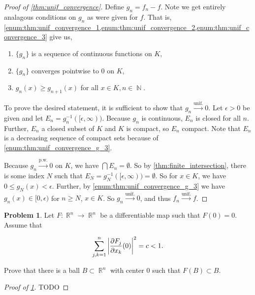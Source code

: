 \documentclass[english]{article}
\DeclareMathOperator{\R}{\mathbb{R}}
\DeclareMathOperator{\N}{\mathbb{N}}
\newcommand{\inv}[1]{#1^{-1}}
\theoremstyle{definition}
\newtheorem{problem}[theorem]{Problem}
\begin{document}
\begin{proof}[Proof of \cref{thm:unif_convergence}]
    Define $g_n = f_n - f$. Note we get entirely analagous conditions on $g_n$ as were given for $f$. That is, \cref{enum:thm:unif_convergence_1,enum:thm:unif_convergence_2,enum:thm:unif_convergence_3} give us,

    \begin{enumerate}
        \item \label{enum:thm:unif_convergence_g_1} $\{g_n\}$ is a sequence of continuous functions on $K$,
        \item \label{enum:thm:unif_convergence_g_2} $\{g_n\}$ converges pointwise to 0 on $K$,
        \item \label{enum:thm:unif_convergence_g_3} $g_n(x) \geq g_{n + 1}(x)$ for all $x \in K, n \in \N$.
    \end{enumerate}
    
    To prove the desired statement, it is sufficient to show that $g_n \overset{\text{unif.}}{\to} 0$. Let $\epsilon > 0$ be given and let $E_n = \inv{g_n}([\epsilon, \infty))$. Because $g_n$ is continuous, $E_n$ is closed for all $n$. Further, $E_n$ a closed subset of  $K$ and $K$ is compact, so $E_n$ compact. Note that $E_n$ is a decreasing sequence of compact sets because of \cref{enum:thm:unif_convergence_g_3}.

    Because $g_n \overset{\text{p.w.}}{\to} 0$ on $K$, we have $\bigcap E_n = \emptyset$. So by \cref{thm:finite_intersection}, there is some index $N$ such that $E_N = \inv{g_N}([\epsilon, \infty)) = \emptyset$. So for $x \in K$, we have $0 \leq g_N(x) < \epsilon$. Further, by \cref{enum:thm:unif_convergence_g_3} we have $g_n(x) \in [0, \epsilon)$ for $n \geq N$, $x \in K$. So $g_n \overset{\text{unif.}}{\to} 0$, and thus $f_n \overset{\text{unif.}}{\to} f$.
\end{proof}

\begin{problem}
    \label{prob:ball_at_origin}
    Let $F: \R^n \to \R^n$ be a differentiable map such that $F(0) = 0$. Assume that 

    \[
      \sum_{j, k = 1}^n \left| {\partial F_j \over \partial x_k} (0) \right|^2 = c < 1.
    \]

    Prove that there is a ball $B \subset \R^n$ with center 0 such that $F(B) \subset B$.
\end{problem}

\begin{proof}[Proof of \cref{prob:ball_at_origin}]
    TODO
\end{proof}
\end{document}
